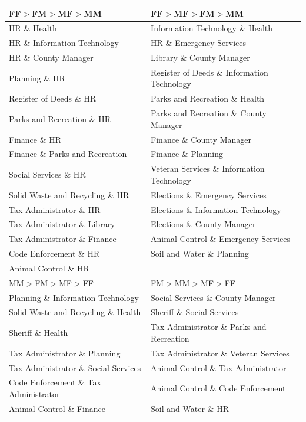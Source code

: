 \documentclass{pnastwo}
\begin{document}
\begin{article}
 \begin{table}[H]
\centering
\begin{tabular}{l|l}
  \toprule
FF$>$FM$>$MF$>$MM & FF$>$MF$>$FM$>$MM \\
\hline
  HR \& Health & Information Technology \& Health \\ 
  HR \& Information Technology & HR \& Emergency Services \\ 
  HR \& County Manager & Library \& County Manager \\ 
  Planning \& HR & Register of Deeds \& Information Technology \\ 
  Register of Deeds \& HR & Parks and Recreation \& Health \\ 
  Parks and Recreation \& HR & Parks and Recreation \& County Manager \\ 
  Finance \& HR & Finance \& County Manager \\ 
  Finance \& Parks and Recreation & Finance \& Planning \\ 
  Social Services \& HR & Veteran Services \& Information Technology \\ 
  Solid Waste and Recycling \& HR & Elections \& Emergency Services \\ 
  Tax Administrator \& HR & Elections \& Information Technology \\ 
  Tax Administrator \& Library & Elections \& County Manager \\ 
  Tax Administrator \& Finance & Animal Control \& Emergency Services \\ 
  Code Enforcement \& HR & Soil and Water \& Planning \\ 
  Animal Control \& HR &  \\ 
  \hline
  MM$>$FM$>$MF$>$FF & FM$>$MM$>$MF$>$FF \\ 
  \hline
  Planning \& Information Technology & Social Services \& County Manager \\ 
  Solid Waste and Recycling \& Health & Sheriff \& Social Services \\ 
  Sheriff \& Health & Tax Administrator \& Parks and Recreation \\ 
  Tax Administrator \& Planning & Tax Administrator \& Veteran Services \\ 
  Tax Administrator \& Social Services & Animal Control \& Tax Administrator \\ 
  Code Enforcement \& Tax Administrator & Animal Control \& Code Enforcement \\ 
  Animal Control \& Finance & Soil and Water \& HR \\ 

\end{tabular}
\end{table}
\end{article}
\end{document}
